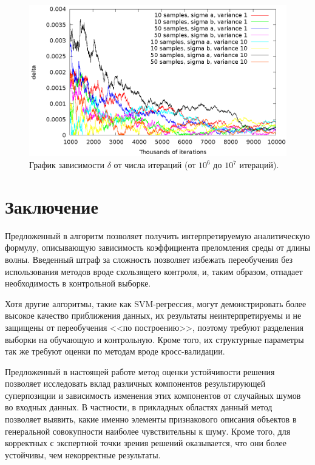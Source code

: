 \documentclass[12pt,a4paper]{article}
\begin{document}
\begin{figure}[h]
  \centering
  \includegraphics[scale=1.2]{figs/classic/variance_all_1000_all.eps}
  \caption{График зависимости $\delta$ от числа итераций (от $10^6$ до $10^7$ итераций).}
  \label{fig:classic_all_1000_all}
\end{figure}

\section{Заключение}

Предложенный в \cite{Rudoy13} алгоритм позволяет получить интерпретируемую аналитическую
формулу, описывающую зависимость коэффициента преломления среды от длины волны.
Введенный штраф за сложность позволяет избежать переобучения без использования методов
вроде скользящего контроля, и, таким образом, отпадает необходимость в контрольной выборке.

Хотя другие алгоритмы, такие как SVM-регрессия, могут демонстрировать более высокое
качество приближения данных, их результаты неинтерпретируемы и не защищены от переобучения
<<по построению>>, поэтому требуют разделения выборки на обучающую и контрольную. Кроме
того, их структурные параметры так же требуют оценки по методам вроде кросс-валидации.

Предложенный в настоящей работе метод оценки устойчивости решения позволяет исследовать вклад различных
компонентов результирующей суперпозиции и зависимость изменения этих компонентов от
случайных шумов во входных данных. В частности, в прикладных областях данный метод позволяет
выявить, какие именно элементы признакового описания объектов в генеральной совокупности
наиболее чувствительны к шуму. Кроме того, для корректных с экспертной точки зрения
решений оказывается, что они более устойчивы, чем некорректные результаты.

\FloatBarrier



\end{document}
